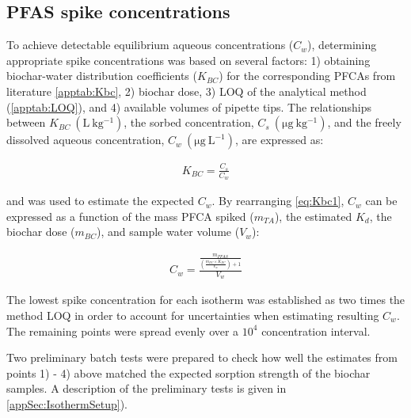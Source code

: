 \subsection{PFAS spike concentrations}
To achieve detectable equilibrium aqueous concentrations ($C_w$), determining appropriate spike concentrations was based on several factors: 1) obtaining biochar-water distribution coefficients ($K_{BC}$) for the corresponding PFCAs from literature \cite{Xiao2017} \cref{apptab:Kbc}, 2) biochar dose, 3) LOQ of the analytical method (\cref{apptab:LOQ}), and 4) available volumes of pipette tips. The relationships between $K_{BC}~\mathrm{(L~kg^{-1})}$, the sorbed concentration, $C_s~\mathrm{(\mu g~kg^{-1})}$, and the freely dissolved aqueous concentration, $C_w~\mathrm{(\mu g~L^{-1})}$, are expressed as:

\begin{align}
    \label{eq:Kbc1}
    K_{BC} = \frac{C_s}{C_w}
\end{align}

and was used to estimate the expected $C_w$. By rearranging \cref{eq:Kbc1}, $C_w$ can be expressed as a function of the mass PFCA spiked ($m_{TA}$), the estimated $K_d$, the biochar dose ($m_{BC}$), and sample water volume ($V_w$):

\begin{align}
    \label{eq:Cw2}
    C_w=\frac{\frac{m_{PFAS}}{\left (\frac{m_{BC}\times K_{BC}}{V_w}\right)+1}}{V_w}
\end{align}

The lowest spike concentration for each isotherm was established as two times the method LOQ in order to account for uncertainties when estimating resulting $C_w$. The remaining points were spread evenly over a $10^4$ concentration interval. 

Two preliminary batch tests were prepared to check how well the estimates from points 1) - 4) above matched the expected sorption strength of the biochar samples. A description of the preliminary tests is given in \cref{appSec:IsothermSetup}).


